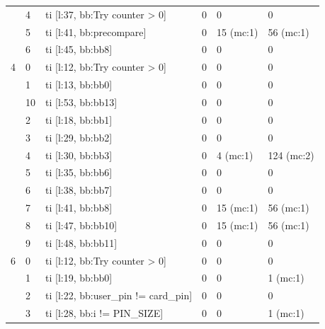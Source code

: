 \begin{table}[ht]
{\begin{tabular}{l|l|l|l|l|l}
                    & 4  & ti [l:37, bb:Try counter \textgreater{} 0] & 0       & 0         & 0           \\
                    & 5  & ti [l:41, bb:precompare]                   & 0       & 15 (mc:1) & 56 (mc:1)   \\
                    & 6  & ti [l:45, bb:bb8]                          & 0       & 0         & 0           \\ 
            \midrule
            4       & 0  & ti [l:12, bb:Try counter \textgreater{} 0] & 0       & 0         & 0           \\
                    & 1  & ti [l:13, bb:bb0]                          & 0       & 0         & 0           \\
                    & 10 & ti [l:53, bb:bb13]                         & 0       & 0         & 0           \\
                    & 2  & ti [l:18, bb:bb1]                          & 0       & 0         & 0           \\
                    & 3  & ti [l:29, bb:bb2]                          & 0       & 0         & 0           \\
                    & 4  & ti [l:30, bb:bb3]                          & 0       & 4 (mc:1)  & 124 (mc:2)  \\
                    & 5  & ti [l:35, bb:bb6]                          & 0       & 0         & 0           \\
                    & 6  & ti [l:38, bb:bb7]                          & 0       & 0         & 0           \\
                    & 7  & ti [l:41, bb:bb8]                          & 0       & 15 (mc:1) & 56 (mc:1)   \\
                    & 8  & ti [l:47, bb:bb10]                         & 0       & 15 (mc:1) & 56 (mc:1)   \\
                    & 9  & ti [l:48, bb:bb11]                         & 0       & 0         & 0           \\ 
            \midrule
            6       & 0  & ti [l:12, bb:Try counter \textgreater{} 0] & 0       & 0         & 0           \\
                    & 1  & ti [l:19, bb:bb0]                          & 0       & 0         & 1 (mc:1)    \\
                    & 2  & ti [l:22, bb:user\_pin != card\_pin]       & 0       & 0         & 0           \\
                    & 3  & ti [l:28, bb:i != PIN\_SIZE]               & 0       & 0         & 1 (mc:1)    \\

\end{tabular}}
\end{table}
